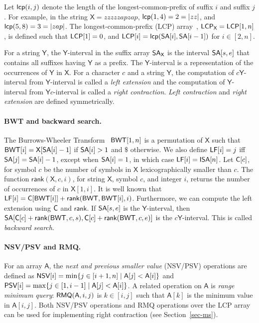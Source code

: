 \documentclass[runningheads]{llncs}
\def\BWT{\mbox{\rm L}}
\def\SA{\mbox{\rm {\sf SA}}}
\def\ISA{\mbox{\rm {\sf ISA}}}
\def\LF{\mbox{\rm {\sf LF}}}
\def\rank{\textsf{rank}}
\def\lcp{\mbox{\rm {\sf lcp}}}
\def\X{\textsf{X}}
\def\A{\textsf{A}}
\def\Y{\mbox{\rm {\sf Y}}}
\def\Y{\textsf{Y}}
\def\C{\mbox{\rm {\sf C}}}
\def\BWT{\mbox{\rm {\sf BWT}}}
\def\LCP{\mbox{\rm {\sf LCP}}}
\def\NSV{\mbox{\rm {\sf NSV}}}
\def\PSV{\mbox{\rm {\sf PSV}}}
\def\RMQ{\mbox{\rm {\sf RMQ}}}
\begin{document}
Let $\lcp(i,j)$ denote the length of the longest-common-prefix of
suffix $i$ and suffix $j$. For example, in the string $\X =
zzzzzapzap$, $\lcp(1,4) = 2 = |zz|$, and $\lcp(5,8) = 3 = |zap|$. The
longest-common-prefix (LCP) array~\cite{klaap2001,KarkkainenMP09},
$\LCP_{\X}=\LCP[1,n]$, is defined such that $\LCP[1] = 0$, and $\LCP[i] =
\lcp(\SA[i],\SA[i-1])$ for $i \in [2,n]$.  
 
For a string $\Y$, the $\Y$-interval in the suffix array $\SA_{\X}$ is
the interval $\SA[s,e]$ that contains all suffixes having $\Y$ as a
prefix. The $\Y$-interval is a representation of the occurrences of
$\Y$ in $\X$. For a character $c$ and a string $\Y$, the computation
of $c\Y$-interval from $\Y$-interval is called a \emph{left extension}
and the computation of $\Y$-interval from ${\Y}c$-interval is called a
\emph{right contraction}. \emph{Left contraction} and \emph{right
  extension} are defined symmetrically.

\paragraph{BWT and backward search.}
The Burrows-Wheeler Transform~\cite{bw1994} $\BWT[1,n]$ is a
permutation of $\X$ such that $\BWT[i] = \X[\SA[i]-1]$ if $\SA[i]>1$
and $\$$ otherwise. We also define $\LF[i] = j$ iff $\SA[j] =
\SA[i]-1$, except when $\SA[i] = 1$, in which case $\LF[i] = \ISA[n]$.
Let $\C[c]$, for symbol $c$ be the number of symbols
in $\X$ lexicographically smaller than $c$.  The function
$\rank(\X,c,i)$, for string $\X$, symbol $c$, and integer $i$, returns
the number of occurrences of $c$ in $\X[1,i]$.  It is well known that
$\LF[i] = \C[\BWT[i]] + \rank(\BWT,\BWT[i],i)$.  Furthermore, we can
compute the left extension using $\C$ and $\rank$.  If $\SA[s,e]$ is
the $\Y$-interval,
then 
$\SA[\C[c]+\rank(\BWT,c,s),\C[c]+\rank(\BWT,c,e)]$ is 
the $c\Y$-interval.
This is called \emph{backward search}.

\paragraph{NSV/PSV and RMQ.} For an array $\A$, the \emph{next and previous
  smaller value} (NSV/PSV) operations are defined as
  $\NSV[i] = \min \{ j\in [i+1,n] \mid \A[j] < \A[i]\}$
and
  $\PSV[i] = \max \{ j\in [1,i-1] \mid \A[j] < \A[i]\}$.  
A related operation on $\A$ is \emph{range minimum
  query}: $\RMQ(\A,i,j)$ is $k\in[i,j]$ such that $\A[k]$ is the
minimum value in $\A[i,j]$. Both NSV/PSV operations and RMQ operations
over the LCP array can be used for implementing right contraction (see
Section~\ref{sec-ms}).
\end{document}
